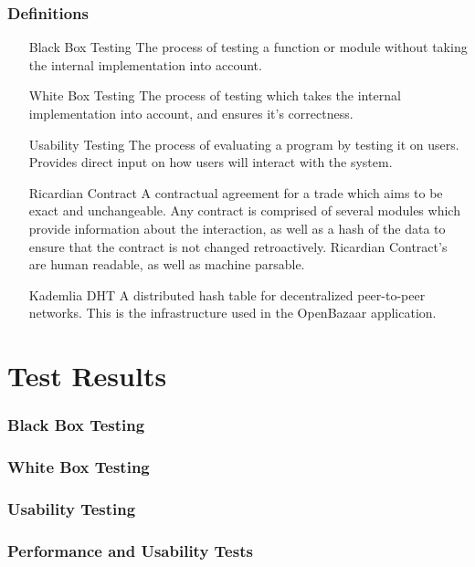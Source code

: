 \documentclass{article}
\begin{document}
\section{Definitions}
\begin{itemize}
\item[Black Box Testing]
The process of testing a function or module without taking the internal implementation into account.

\item[White Box Testing]
The process of testing which takes the internal implementation into account, and ensures it's correctness.

\item[Usability Testing]
The process of evaluating a program by testing it on users. Provides direct input on how users will interact with the system.

\item[Ricardian Contract]
A contractual agreement for a trade which aims to be exact and unchangeable. Any contract is comprised of several modules which provide information about the interaction, as well as a hash of the data to ensure that the contract is not changed retroactively. Ricardian Contract's are human readable, as well as machine parsable. 

\item[Kademlia DHT]
A distributed hash table for decentralized peer-to-peer networks. This is the infrastructure used in the OpenBazaar application.
\end{itemize}

\part*{Test Results}
\section{Black Box Testing}

\section{White Box Testing}

\section{Usability Testing}

\section{Performance and Usability Tests}
\end{document}

